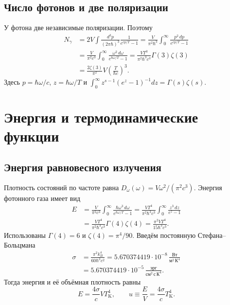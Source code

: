 \documentclass[../final.tex]{subfiles}
\begin{document}
\subsection{Число фотонов и две поляризации}
У фотона две независимые поляризации. Поэтому
\begin{align*}
 N_\gamma&=2V\int\frac{d^3p}{(2\pi\hbar)^3}\frac1{e^{cp/T}-1}
 =\frac{V}{\pi^2\hbar^3}\int_0^\infty\frac{p^2\,dp}{e^{cp/T}-1}\\
 &=\frac{V}{\pi^2c^3}\int_0^\infty\frac{\omega^2\,d\omega}{e^{\hbar\omega/T}-1}
 =\frac{VT^3}{\pi^2\hbar^3c^3}\Gamma(3)\zeta(3)\\
 &=\frac{2\zeta(3)}{\pi^2}V\left(\frac{T}{\hbar c}\right)^3.
\end{align*}
Здесь $p=\hbar\omega/c$, $z=\hbar\omega/T$ и
$\int_0^\infty z^{s-1}(e^z-1)^{-1}dz=\Gamma(s)\zeta(s)$.

\clearpage
\section{Энергия и термодинамические функции}
\subsection{Энергия равновесного излучения}
Плотность состояний по частоте равна $D_\omega(\omega)=V\omega^2/(\pi^2c^3)$.
Энергия фотонного газа имеет вид
\begin{align*}
 E&=\frac{V}{\pi^2c^3}\int_0^\infty
 \frac{\hbar\omega^3\,d\omega}{e^{\hbar\omega/T}-1}
 =\frac{VT^4}{\pi^2\hbar^3c^3}\int_0^\infty\frac{z^3\,dz}{e^z-1}\\
 &=\frac{VT^4}{\pi^2\hbar^3c^3}\Gamma(4)\zeta(4)
 =\frac{\pi^2VT^4}{15\hbar^3c^3}.
\end{align*}
Использованы $\Gamma(4)=6$ и $\zeta(4)=\pi^4/90$.
Введём постоянную Стефана--Больцмана
\begin{align*}
 \sigma&=\frac{\pi^2k_B^4}{60\hbar^3c^2}
 =5.670374419\cdot10^{-8}\,
 \frac{\text{Вт}}{\text{м}^2\,\text{К}^4}\\
 &=5.670374419\cdot10^{-5}\,
 \frac{\text{эрг}}{\text{см}^2\,\text{с}\,\text{К}^4}.
\end{align*}
Тогда энергия и её объёмная плотность равны
\begin{equation*}
 E=\frac{4\sigma}{c}VT_{\mathrm K}^4,\qquad
 u\equiv\frac EV=\frac{4\sigma}{c}T_{\mathrm K}^4.
\end{equation*}
\end{document}
